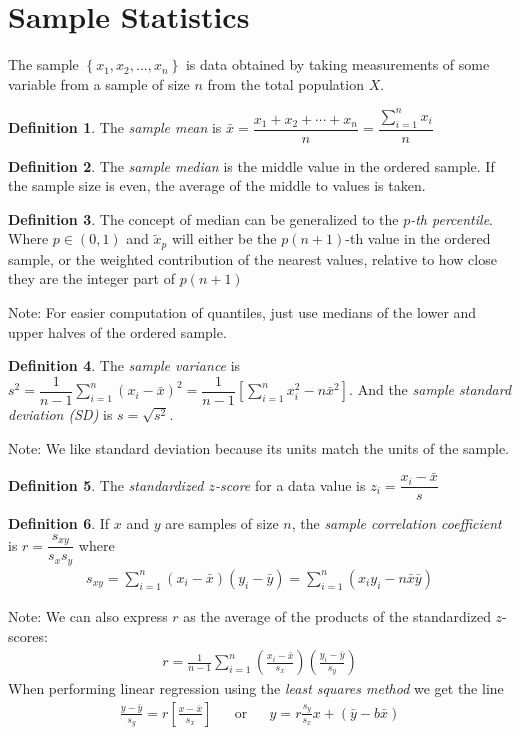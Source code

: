 \documentclass[10pt]{article}
\theoremstyle{definition}
\newtheorem*{definition}{Definition}
\theoremstyle{theorem}
\newcommand{\ds}{\displaystyle}
\begin{document}
\section*{Sample Statistics}
The sample \(\left\{x_1, x_2, \ldots, x_n\right\}\) is data obtained by taking measurements of some variable from a sample of size \(n\) from the total population \(X\).

\begin{definition}
	The \emph{sample mean} is \(\bar{x}= \dfrac{x_1+x_2+\cdots+x_n}{n}=\dfrac{\sum_{i=1}^{n}x_i}{n}\)
\end{definition}

\begin{definition}
	The \emph{sample median} is the middle value in the ordered sample. If the sample size is even, the average of the middle to values is taken.
\end{definition}

\begin{definition}
	The concept of median can be generalized to the \emph{\(p\)-th percentile}. Where \(p\in (0,1)\) and \(\tilde{x}_p\) will either be the \(p(n+1)\)-th value in the ordered sample, or the weighted contribution of the nearest values, relative to how close they are the integer part of \(p(n+1)\)
\end{definition}

Note: For easier computation of quantiles, just use medians of the lower and upper halves of the ordered sample.

\begin{definition}
	The \emph{sample variance} is \(s^2=\dfrac{1}{n-1}\ds\sum_{i=1}^{n}(x_i - \bar{x})^2 = \dfrac{1}{n-1}\left[\sum_{i=1}^{n}x_i^2 - n\bar{x}^2\right]\). And the \emph{sample standard deviation (SD)} is \(s=\sqrt{s^2}\).
\end{definition}

Note: We like standard deviation because its units match the units of the sample.

\begin{definition}
	The \emph{standardized \(z\)-score} for a data value is \(z_i = \dfrac{x_i - \bar{x}}{s}\)
\end{definition}

\begin{definition}
	If \(x\) and \(y\) are samples of size \(n\), the \emph{sample correlation coefficient} is \(r=\dfrac{s_{xy}}{s_x s_y}\) where
	\begin{align*}
		s_{xy} = \sum_{i=1}^{n}(x_i - \bar{x})(y_i - \bar{y}) = \sum_{i=1}^{n}(x_i y_i - n\bar{x}\bar{y})
	\end{align*}
\end{definition}
Note: We can also express \(r\) as the average of the products of the standardized \(z\)-scores:
\begin{align*}
	r = \frac{1}{n-1} \sum_{i=1}^{n} \left( \frac{x_i-\bar{x}}{s_x} \right) \left( \frac{y_i-\bar{y}}{s_y} \right)
\end{align*}
When performing linear regression using the \emph{least squares method} we get the line
\begin{align*}
	\frac{y-\bar{y}}{s_y} = r \left[\frac{x-\bar{x}}{s_x}\right] && \text{or} && y = r\frac{s_y}{s_x}x + (\bar{y}-b\bar{x})
\end{align*}
\end{document}
